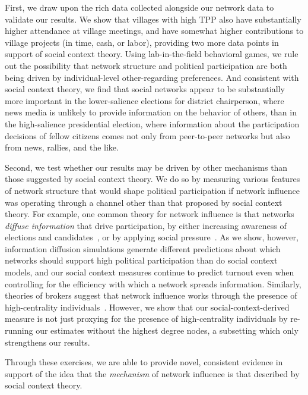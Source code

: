 \documentclass[12pt]{article}
\begin{document}
First, we draw upon the rich data collected alongside our network data to validate our results. We show that villages with high TPP also have substantially higher attendance at village meetings, and have somewhat higher contributions to village projects (in time, cash, or labor), providing two more data points in support of social context theory. Using lab-in-the-field behavioral games, we rule out the possibility that network structure and political participation are both being driven by individual-level other-regarding preferences. And consistent with social context theory, we find that social networks appear to be substantially more important in the lower-salience elections for district chairperson, where news media is unlikely to provide information on the behavior of others, than in the high-salience presidential election, where information about the participation decisions of fellow citizens comes not only from peer-to-peer networks but also from news, rallies, and the like.

Second, we test whether our results may be driven by other mechanisms than those suggested by social context theory. We do so by measuring various features of network structure that would shape political participation if network influence was operating through a channel other than that proposed by social context theory. For example, one common theory for network influence is that networks \emph{diffuse information} that drive participation, by either increasing awareness of elections and candidates~\citep{mcclurg2003social}, or by applying social pressure~\citep{EubankKronick, larson2017west}. As we show, however, information diffusion simulations generate different predictions about which networks should support high political participation than do social context models, and our social context measures continue to predict turnout even when controlling for the efficiency with which a network spreads information. Similarly, theories of brokers suggest that network influence works through the presence of high-centrality individuals~\citep{Rojo:2014vw}. However, we show that our social-context-derived measure is not just proxying for the presence of high-centrality individuals by re-running our estimates without the highest degree nodes, a subsetting which only strengthens our results.

Through these exercises, we are able to provide novel, consistent evidence in support of the idea that the \emph{mechanism} of network influence is that described by social context theory.
\end{document}
